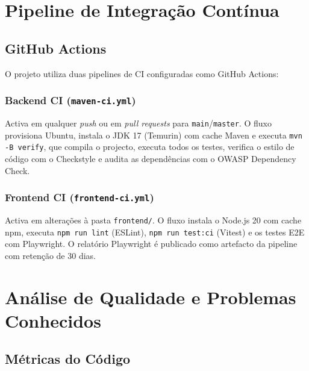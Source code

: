 \documentclass[12pt, a4paper]{report}
\begin{document}
\chapter{Pipeline de Integração Contínua}

\section{GitHub Actions}

O projeto utiliza duas pipelines de CI configuradas como GitHub Actions:

\subsection{Backend CI (\texttt{maven-ci.yml})}

Activa em qualquer \emph{push} ou em \emph{pull requests} para \texttt{main}/\texttt{master}.
O fluxo provisiona Ubuntu, instala o JDK 17 (Temurin) com cache Maven e executa
\texttt{mvn -B verify}, que compila o projecto, executa todos os testes,
verifica o estilo de código com o Checkstyle e audita as dependências com o
OWASP Dependency Check.

\subsection{Frontend CI (\texttt{frontend-ci.yml})}

Activa em alterações à pasta \texttt{frontend/}. O fluxo instala o Node.js 20
com cache npm, executa \texttt{npm run lint} (ESLint), \texttt{npm run test:ci}
(Vitest) e os testes E2E com Playwright. O relatório Playwright é publicado como
artefacto da pipeline com retenção de 30 dias.

\chapter{Análise de Qualidade e Problemas Conhecidos}
\label{chap:qualidade}

\section{Métricas do Código}
\end{document}
